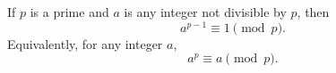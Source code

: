 If $p$ is a prime and $a$ is any integer not divisible by $p$, then
$$a^{p-1} \equiv 1 \pmod{p}.$$
Equivalently, for any integer $a$,
$$a^p \equiv a \pmod{p}.$$
